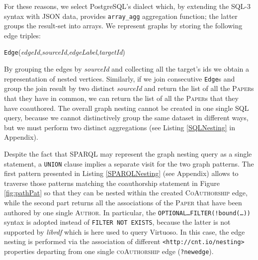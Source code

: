 For these reasons, we select PostgreSQL's dialect which, by extending the SQL-3 syntax with JSON data, provides \texttt{array\_agg} aggregation function; the latter groups the result-set into arrays.  We  represent  graphs by  storing the following edge triples:
\begin{center}
 \texttt{Edge}(\textit{edgeId},\;\textit{sourceId},\;\textit{edgeLabel},\;\textit{targetId})
\end{center}
By grouping the edges by \textit{sourceId} and collecting all the target's ids we obtain a representation of nested vertices. Similarly, if we join consecutive \texttt{Edge}s and group the join result by two distinct \textit{sourceId} and return the list of all the \textsc{Paper}s that they have in common, we can return the list of all the \textsc{Paper}s that they have coauthored. The overall graph nesting cannot be created in one single SQL query, because we cannot distinctively group the same dataset in different ways, but we must perform two distinct aggregations (see Listing \ref{SQLNesting} in Appendix). 


Despite the fact that SPARQL  may represent the graph nesting query as a single statement, a \texttt{UNION} clause implies a separate visit for the two graph patterns. The first pattern presented in Listing \ref{SPARQLNesting} (see Appendix) allows to traverse those  patterns matching the coauthorship statement in Figure \ref{fig:pathPat} so that they can be nested within the created \textsc{CoAuthorship} edge, while the second part returns all the associations of the \textsc{Paper} that have been authored by one single \textsc{Author}. In particular, the \texttt{OPTIONAL\dots FILTER(!bound(\dots))} syntax is adopted instead of \texttt{FILTER NOT EXISTS}, because the latter is not supported by \textit{librdf} which is here used to query Virtuoso. In this case, the edge nesting is performed via the association of different \texttt{<http://cnt.io/nesting>} properties departing from one single  \textsc{coAuthorship} edge (\texttt{?newedge}). 

